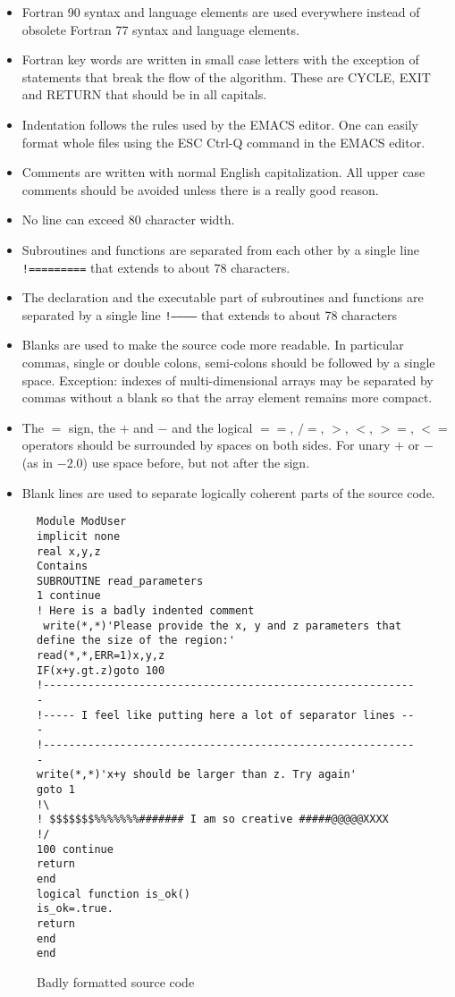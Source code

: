 \documentclass{article}
\begin{document}
\begin{itemize}
\item Fortran 90 syntax and language elements are used everywhere instead 
      of obsolete Fortran 77 syntax and language elements.
\item Fortran key words are written in small case letters with the 
      exception of statements that break the flow of the algorithm.
      These are CYCLE, EXIT and RETURN that should be in all capitals.
\item Indentation follows the rules used by the EMACS editor. One can
      easily format whole files using the ESC Ctrl-Q command in the
      EMACS editor.
\item Comments are written with normal English capitalization. All upper
      case comments should be avoided unless there is a really good reason.
\item No line can exceed 80 character width. 
\item Subroutines and functions are separated from each other 
      by a single line {\tt !=========} that extends to about 78 characters.
\item The declaration and the executable part of subroutines and functions
      are separated by a single line {\tt !------------} that extends to 
      about 78 characters
\item Blanks are used to make the source code more readable. In particular
      commas, single or double colons, semi-colons should be followed
      by a single space. Exception: indexes of multi-dimensional arrays
      may be separated by commas without a blank so that the array
      element remains more compact.
\item The $=$ sign, the $+$ and $-$ and the logical 
      $==$, $/=$, $>$, $<$, $>=$, $<=$ operators should be surrounded
      by spaces on both sides. For unary $+$ or $-$ (as in $-2.0$) use 
      space before, but not after the sign.
\item Blank lines are used to separate logically coherent parts of the 
      source code.
\end{itemize}

\begin{figure}
\begin{verbatim}
Module ModUser
implicit none
real x,y,z
Contains
SUBROUTINE read_parameters 
1 continue
! Here is a badly indented comment
 write(*,*)'Please provide the x, y and z parameters that define the size of the region:'
read(*,*,ERR=1)x,y,z
IF(x+y.gt.z)goto 100
!-----------------------------------------------------------
!----- I feel like putting here a lot of separator lines ---
!-----------------------------------------------------------
write(*,*)'x+y should be larger than z. Try again'
goto 1
!\
! $$$$$$$%%%%%%%####### I am so creative #####@@@@@XXXX
!/
100 continue
return
end
logical function is_ok()
is_ok=.true.
return
end
end
\end{verbatim}
\caption{Badly formatted source code}
\label{fig:badformat}
\end{figure}
\end{document}
